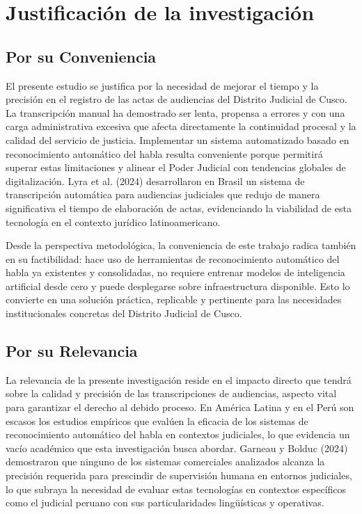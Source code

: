 \documentclass[12pt,a4paper,oneside]{article}
\begin{document}
\section{Justificaci\'on de la investigaci\'on}

\subsection{Por su Conveniencia}

El presente estudio se justifica por la necesidad de mejorar el tiempo y la precisi\'on en el registro de las actas de audiencias del Distrito Judicial de Cusco. La transcripci\'on manual ha demostrado ser lenta, propensa a errores y con una carga administrativa excesiva que afecta directamente la continuidad procesal y la calidad del servicio de justicia. Implementar un sistema automatizado basado en reconocimiento autom\'atico del habla resulta conveniente porque permitir\'a superar estas limitaciones y alinear el Poder Judicial con tendencias globales de digitalizaci\'on. Lyra et al. (2024) desarrollaron en Brasil un sistema de transcripci\'on autom\'atica para audiencias judiciales que redujo de manera significativa el tiempo de elaboraci\'on de actas, evidenciando la viabilidad de esta tecnolog\'ia en el contexto jur\'idico latinoamericano.

Desde la perspectiva metodol\'ogica, la conveniencia de este trabajo radica tambi\'en en su factibilidad: hace uso de herramientas de reconocimiento autom\'atico del habla ya existentes y consolidadas, no requiere entrenar modelos de inteligencia artificial desde cero y puede desplegarse sobre infraestructura disponible. Esto lo convierte en una soluci\'on pr\'actica, replicable y pertinente para las necesidades institucionales concretas del Distrito Judicial de Cusco.

\subsection{Por su Relevancia}

La relevancia de la presente investigaci\'on reside en el impacto directo que tendr\'a sobre la calidad y precisi\'on de las transcripciones de audiencias, aspecto vital para garantizar el derecho al debido proceso. En Am\'erica Latina y en el Per\'u son escasos los estudios emp\'iricos que eval\'uen la eficacia de los sistemas de reconocimiento autom\'atico del habla en contextos judiciales, lo que evidencia un vac\'io acad\'emico que esta investigaci\'on busca abordar. Garneau y Bolduc (2024) demostraron que ninguno de los sistemas comerciales analizados alcanza la precisi\'on requerida para prescindir de supervisi\'on humana en entornos judiciales, lo que subraya la necesidad de evaluar estas tecnolog\'ias en contextos espec\'ificos como el judicial peruano con sus particularidades ling\"u\'isticas y operativas.
\end{document}
